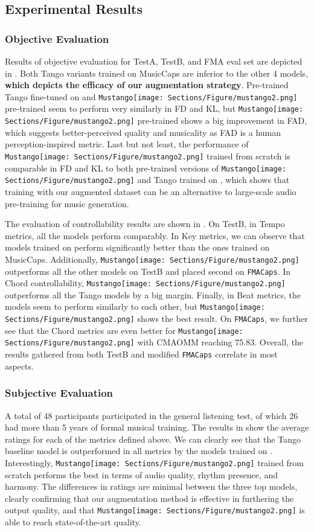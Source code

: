 \documentclass[11pt]{article}
\newcommand{\datasetFMA}{\texttt{FMACaps}}
\newcommand{\model}{\texttt{Mustango}}
\newcommand{\modelemoji}{\model{}\texttt{[image: Sections/Figure/mustango2.png]}}
\begin{document}
\subsection{Experimental Results}
\subsubsection{Objective Evaluation}
Results of objective evaluation for TestA, TestB, and FMA eval set are depicted in . Both Tango variants trained on MusicCaps are inferior to the other 4 models, \textbf{which depicts the efficacy of our augmentation strategy}. Pre-trained Tango fine-tuned on \dataset{} and \modelemoji{} pre-trained seem to perform very similarly in FD and KL, but \modelemoji{} pre-trained shows a big improvement in FAD, which suggests better-perceived quality and musicality as FAD is a human perception-inspired metric. Last but not least, the performance of \modelemoji{} trained from scratch is comparable in FD and KL to both pre-trained versions of \modelemoji{} and Tango trained on \dataset{}, which shows that training with our augmented dataset can be an alternative to large-scale audio pre-training for music generation.

The evaluation of controllability results are shown in . On TestB, in Tempo metrics, all the models perform comparably. In Key metrics, we can observe that models trained on \dataset{} perform significantly better than the ones trained on MusicCaps. Additionally, \modelemoji{} outperforms all the other models on TestB and placed second on \datasetFMA{}. In Chord controllability, \modelemoji{} outperforms all the Tango models by a big margin. Finally, in Beat metrics, the models seem to perform similarly to each other, but \modelemoji{} shows the best result. On \datasetFMA{}, we further see that the Chord metrics are even better for \modelemoji{} with CMAOMM reaching 75.83. Overall, the results gathered from both TestB and modified \datasetFMA{} correlate in most aspects.



\subsubsection{Subjective Evaluation}

A total of 48 participants participated in the general listening test, of which 26 had more than 5 years of formal musical training. The results in  show the average ratings for each of the metrics defined above. We can clearly see that the Tango baseline model is outperformed in all metrics by the models trained on \dataset{}. Interestingly, \modelemoji{} trained from scratch performs the best in terms of audio quality, rhythm presence, and harmony. The differences in ratings are minimal between the three top models, clearly confirming that our augmentation method is effective in furthering the output quality, and that \modelemoji{} is able to reach state-of-the-art quality. 
\end{document}
